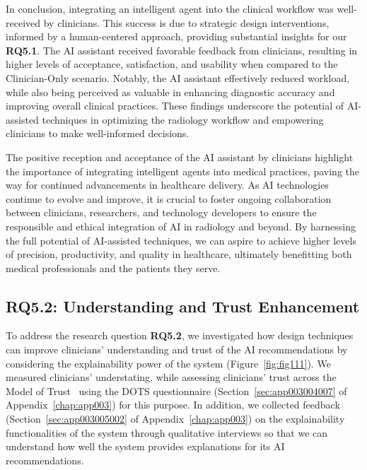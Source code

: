 In conclusion, integrating an intelligent agent into the clinical workflow was well-received by clinicians.
This success is due to strategic design interventions, informed by a human-centered approach, providing substantial insights for our {\bf RQ5.1}.
The \ac{AI} assistant received favorable feedback from clinicians, resulting in higher levels of acceptance, satisfaction, and usability when compared to the Clinician-Only scenario.
Notably, the \ac{AI} assistant effectively reduced workload, while also being perceived as valuable in enhancing diagnostic accuracy and improving overall clinical practices.
These findings underscore the potential of \ac{AI}-assisted techniques in optimizing the radiology workflow and empowering clinicians to make well-informed decisions.

The positive reception and acceptance of the \ac{AI} assistant by clinicians highlight the importance of integrating intelligent agents into medical practices, paving the way for continued advancements in healthcare delivery.
As \ac{AI} technologies continue to evolve and improve, it is crucial to foster ongoing collaboration between clinicians, researchers, and technology developers to ensure the responsible and ethical integration of \ac{AI} in radiology and beyond.
By harnessing the full potential of \ac{AI}-assisted techniques, we can aspire to achieve higher levels of precision, productivity, and quality in healthcare, ultimately benefitting both medical professionals and the patients they serve.

\subsection{RQ5.2: Understanding and Trust Enhancement}
\label{sec:chap005006002}

To address the research question {\bf RQ5.2}, we investigated how design techniques can improve clinicians' understanding and trust of the \ac{AI} recommendations by considering the explainability power of the system (Figure~\ref{fig:fig111}).
We measured clinicians' understating, while assessing clinicians' trust across the Model of Trust~\cite{CALISTO2021102607} using the \ac{DOTS} questionnaire (Section~\ref{sec:app003004007} of Appendix~\ref{chap:app003}) for this purpose.
In addition, we collected feedback (Section~\ref{sec:app003005002} of Appendix~\ref{chap:app003}) on the explainability functionalities of the system through qualitative interviews so that we can understand how well the system provides explanations for its \ac{AI} recommendations.

